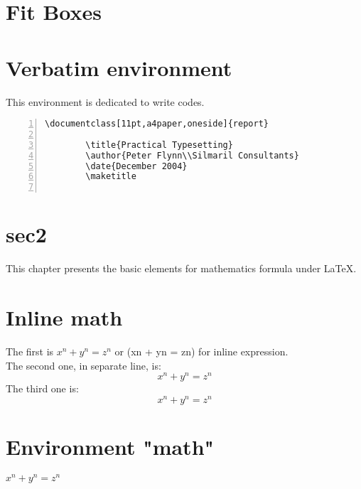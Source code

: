 \clearpage
\section{Fit Boxes}

\begin{tcolorbox}[enhanced,fit to height=10cm,
	colback=green!25!black!10!white,colframe=green!75!black,title=Fit box (10cm),
	drop fuzzy shadow,watermark color=white,watermark text=Fit]
	\lipsum[1-4]
\end{tcolorbox}

\begin{tcolorbox}[enhanced,fit to height=5cm,
	colback=green!25!black!10!white,colframe=green!75!black,title=Fit box (5cm),
	drop fuzzy shadow,watermark color=white,watermark text=Fit]
	\lipsum[1-4]
\end{tcolorbox}

\section{Verbatim environment}
This environment is dedicated to write codes.
\begin{Verbatim}[numbers=left, xleftmargin=5mm]
	\documentclass[11pt,a4paper,oneside]{report}
	
		\title{Practical Typesetting}
		\author{Peter Flynn\\Silmaril Consultants}
		\date{December 2004}
		\maketitle
	
\end{Verbatim}

\section{sec2}
This chapter presents the basic elements for mathematics formula under \LaTeX.
\section{Inline math}
The first is $ x^n + y^n = z^n$ or (xn + yn = zn) for inline expression. \\
The second one, in separate line, is: $$ x^n + y^n = z^n$$
The third one is: \[x^n + y^n = z^n \] 
\section{Environment "math" }
\begin{math}
	x^n + y^n = z^n
\end{math}
